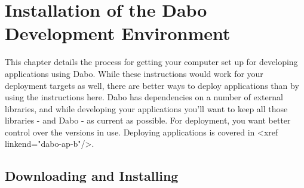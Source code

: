 
\chapter{Installation of the Dabo Development Environment}

This chapter details the process for getting your computer set up for developing applications using Dabo. While these instructions would work for your deployment targets as well, there are better ways to deploy applications than by using the instructions here. Dabo has dependencies on a number of external libraries, and while developing your applications you'll want to keep all those libraries - and Dabo - as current as possible. For deployment, you want better control over the versions in use. Deploying applications is covered in <xref linkend="dabo-ap-b"/>.

\section{Downloading and Installing}

